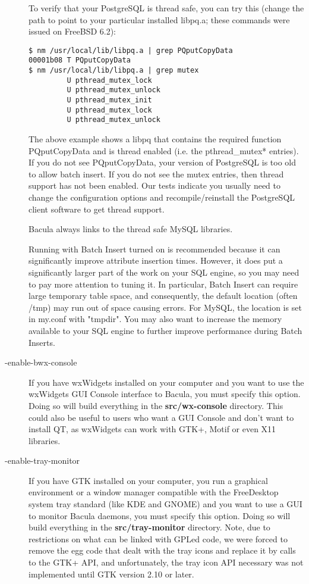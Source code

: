 \begin{description}
   To verify that your PostgreSQL is thread safe, you can try this
   (change the path to point to your particular installed libpq.a;
   these commands were issued on FreeBSD 6.2):

\begin{verbatim}
$ nm /usr/local/lib/libpq.a | grep PQputCopyData
00001b08 T PQputCopyData
$ nm /usr/local/lib/libpq.a | grep mutex
         U pthread_mutex_lock
         U pthread_mutex_unlock
         U pthread_mutex_init
         U pthread_mutex_lock
         U pthread_mutex_unlock
\end{verbatim}

   The above example shows a libpq that contains the required function
   PQputCopyData and is thread enabled (i.e. the pthread\_mutex* entries).
   If you do not see PQputCopyData, your version of PostgreSQL is too old
   to allow batch insert.  If you do not see the mutex entries, then thread
   support has not been enabled. Our tests indicate you usually need to
   change the configuration options and recompile/reinstall the PostgreSQL
   client software to get thread support.

   Bacula always links to the thread safe MySQL libraries.

   Running with Batch Insert turned on is recommended because it can
   significantly improve attribute insertion times. However, it does 
   put a significantly larger part of the work on your SQL engine, so
   you may need to pay more attention to tuning it. In particular,   
   Batch Insert can require large temporary table space, and consequently,
   the default location (often /tmp) may run out of space causing errors.
   For MySQL, the location is set in my.conf with "tmpdir".  You may also
   want to increase the memory available to your SQL engine to further
   improve performance during Batch Inserts.

\item [ {-}{\-}enable-bwx-console ]
   If you have wxWidgets installed on your computer and you want to use the
   wxWidgets GUI Console interface to Bacula, you must specify this option.
   Doing so will build everything in the {\bf src/wx-console} directory.
   This could also be useful to users who want a GUI Console and don't want
   to install QT, as wxWidgets can work with GTK+, Motif or even X11
   libraries.

\item [ {-}{\-}enable-tray-monitor ]
   If you have GTK installed on your computer, you run a graphical
   environment or a window manager compatible with the FreeDesktop system
   tray standard (like KDE and GNOME) and you want to use a GUI to monitor
   Bacula daemons, you must specify this option.  Doing so will build
   everything in the {\bf src/tray-monitor} directory. Note, due to 
   restrictions on what can be linked with GPLed code, we were forced to
   remove the egg code that dealt with the tray icons and replace it by
   calls to the GTK+ API, and unfortunately, the tray icon API necessary
   was not implemented until GTK version 2.10 or later.


\end{description}
